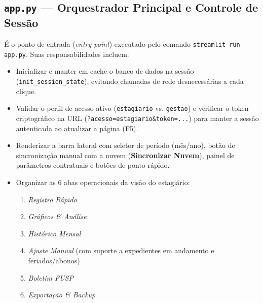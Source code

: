 \documentclass[11pt,a4paper]{article}
\begin{document}
\subsection{\texttt{app.py} --- Orquestrador Principal e Controle de Sessão}
É o ponto de entrada (\textit{entry point}) executado pelo comando \texttt{streamlit run app.py}. Suas responsabilidades incluem:
\begin{itemize}[leftmargin=1.5em]
    \item Inicializar e manter em cache o banco de dados na sessão (\texttt{init\_session\_state}), evitando chamadas de rede desnecessárias a cada clique.
    \item Validar o perfil de acesso ativo (\texttt{estagiario} vs. \texttt{gestao}) e verificar o token criptográfico na URL (\texttt{?acesso=estagiario\&token=...}) para manter a sessão autenticada ao atualizar a página (F5).
    \item Renderizar a barra lateral com seletor de período (mês/ano), botão de sincronização manual com a nuvem (\textbf{Sincronizar Nuvem}), painel de parâmetros contratuais e botões de ponto rápido.
    \item Organizar as 6 abas operacionais da visão do estagiário:
    \begin{enumerate}
        \item \textit{Registro Rápido}
        \item \textit{Gráficos \& Análise}
        \item \textit{Histórico Mensal}
        \item \textit{Ajuste Manual} (com suporte a expedientes em andamento e feriados/abonos)
        \item \textit{Boletim FUSP}
        \item \textit{Exportação \& Backup}
    \end{enumerate}
\end{itemize}
\end{document}
